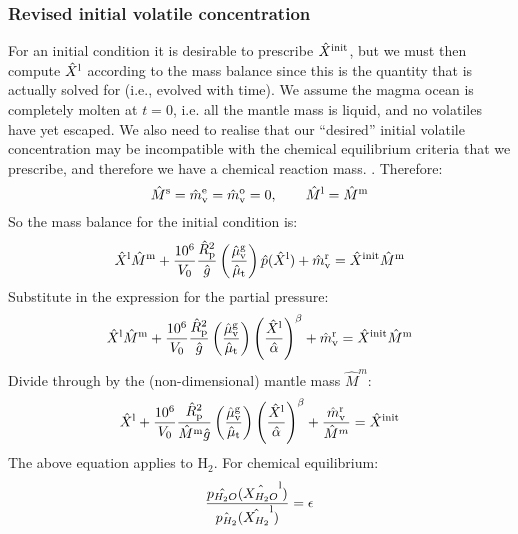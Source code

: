 \subsubsection{Revised initial volatile concentration}
For an initial condition it is desirable to prescribe $\hat{X}^{\rm init}$, but we must then compute $\hat{X}^{\rm l}$ according to the mass balance since this is the quantity that is actually solved for (i.e., evolved with time).  We assume the magma ocean is completely molten at $t=0$, i.e. all the mantle mass is liquid, and no volatiles have yet escaped.  We also need to realise that our ``desired'' initial volatile concentration may be incompatible with the chemical equilibrium criteria that we prescribe, and therefore we have a chemical reaction mass.  .  Therefore:
\begin{equation}
\hat{M}^{\rm s} = \hat{m}_{\rm v}^{\rm e} = \hat{m}_{\rm v}^{\rm o} = 0, \qquad \hat{M}^{\rm l} = \hat{M}^{\rm m}
\end{equation}
So the mass balance for the initial condition is:
\begin{equation}
\hat{X}^{\rm l} \hat{M}^{\rm m} + \frac{10^6}{V_0} \frac{\hat{R}_{\rm p}^2}{\hat{g}} \left( \frac{\hat{\mu}_{\rm v}^{\rm g}}{\hat{\mu}_{\rm t}} \right)\hat{p} (\hat{X}^{\rm l}) + \hat{m}_{\rm v}^{\rm r} = \hat{X}^{\rm init} \hat{M}^{\rm m}
\end{equation}
Substitute in the expression for the partial pressure:
\begin{equation}
\hat{X}^{\rm l} \hat{M}^{\rm m} + \frac{10^6}{V_0} \frac{\hat{R}_{\rm p}^2}{\hat{g}} \left( \frac{\hat{\mu}_{\rm v}^{\rm g}}{\hat{\mu}_{\rm t}} \right)\left( \frac{\hat{X}^{\rm l}}{\hat{\alpha}} \right)^\beta + \hat{m}_{\rm v}^{\rm r} = \hat{X}^{\rm init} \hat{M}^{\rm m}
\end{equation}
Divide through by the (non-dimensional) mantle mass $\hat{M}^m$:
\begin{equation}
\hat{X}^{\rm l} + \frac{10^6}{V_0} \frac{\hat{R}_{\rm p}^2}{\hat{M}^{\rm m} \hat{g}} \left( \frac{\hat{\mu}_{\rm v}^{\rm g}}{\hat{\mu}_{\rm t}} \right)\left( \frac{\hat{X}^{\rm l}}{\hat{\alpha}} \right)^\beta + \frac{\hat{m}_{\rm v}^{\rm r}}{\hat{M}^m} = \hat{X}^{\rm init}
\end{equation}
The above equation applies to H$_2$.
For chemical equilibrium:
\begin{equation}
\frac{\hat{p_{H_2O}} (\hat{X_{H_2O}}^{\rm l})}{\hat{p_{H_2}} (\hat{X_{H_2}}^{\rm l})} = \epsilon
\end{equation}

